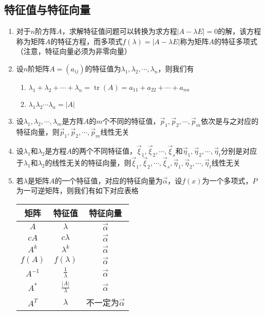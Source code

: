 \documentclass[12pt,a4paper,UTF8]{book}
\begin{document}
\subsection{特征值与特征向量}
\begin{enumerate}
\item 对于$n$阶方阵$A$，求解特征值问题可以转换为求方程$\left|A-\lambda E\right|=0$的解，该方程称为矩阵$A$的特征方程，而多项式$f\left(\lambda\right)=\left|A-\lambda E\right|$称为矩阵$A$的特征多项式（注意，特征向量必须为非零向量）
\item 设$n$阶矩阵$A=\left(a_{ij}\right)$的特征值为$\lambda_1,\lambda_2,\cdots,\lambda_n$，则我们有
\begin{enumerate}
\item $\lambda_1+\lambda_2+\cdots+\lambda_n=\operatorname{tr}\left(A\right)=a_{11}+a_{22}+\cdots+a_{nn}$
\item $\lambda_1\lambda_2\cdots\lambda_n=\left|A\right|$
\end{enumerate}
\item 设$\lambda_1,\lambda_2,\cdots,\lambda_m$是方阵$A$的$m$个不同的特征值，$\vec{p}_1,\vec{p}_2,\cdots,\vec{p}_m$依次是与之对应的特征向量，则$\vec{p}_1,\vec{p}_2,\cdots,\vec{p}_m$线性无关
\item 设$\lambda_1$和$\lambda_2$是方程$A$的两个不同特征值，$\vec{\xi}_1,\vec{\xi}_2,\cdots,\vec{\xi}_s$和$\vec{\eta}_1,\vec{\eta}_2,\cdots,\vec{\eta}_t$分别是对应于$\lambda_1$和$\lambda_2$的线性无关的特征向量，则$\vec{\xi}_1,\vec{\xi}_2,\cdots,\vec{\xi}_s,\vec{\eta}_1,\vec{\eta}_2,\cdots,\vec{\eta}_t$线性无关
\item 若$\lambda$是矩阵$A$的一个特征值，对应的特征向量为$\vec{\alpha}$，设$f\left(x\right)$为一个多项式，$P$为一可逆矩阵，则我们有如下对应表格
\begin{normalsize}
\begin{center}
\begin{longtable}{|c|c|c|}
\hline
矩阵&特征值&特征向量\\
\hline
$A$&$\lambda$&$\vec{\alpha}$\\
\hline
$cA$&$c\lambda$&$\vec{\alpha}$\\
\hline
$A^k$&$\lambda^k$&$\vec{\alpha}$\\
\hline
$f\left(A\right)$&$f\left(\lambda\right)$&$\vec{\alpha}$\\
\hline
$A^{-1}$&$\frac{1}{\lambda}$&$\vec{\alpha}$\\
\hline
$A^*$&$\frac{\left|A\right|}{\lambda}$&$\vec{\alpha}$\\
\hline
$A^T$&$\lambda$&不一定为$\vec{\alpha}$\\

\end{longtable}
\end{center}
\end{normalsize}
\end{enumerate}
\end{document}
